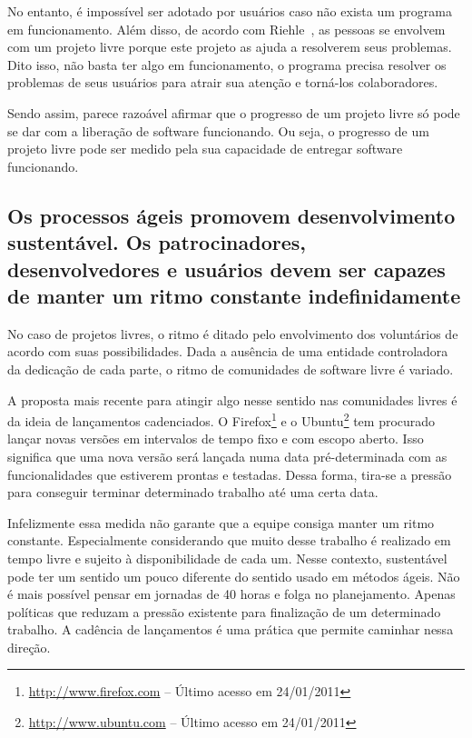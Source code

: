 No entanto, é impossível ser adotado por usuários caso não exista um
programa em funcionamento. Além disso, de acordo com
Riehle~\cite{Riehle2007}, as pessoas se envolvem com um projeto livre
porque este projeto as ajuda a resolverem seus problemas. Dito isso,
não basta ter algo em funcionamento, o programa precisa resolver os
problemas de seus usuários para atrair sua atenção e torná-los
colaboradores.

Sendo assim, parece razoável afirmar que o progresso de um projeto
livre só pode se dar com a liberação de software funcionando. Ou seja,
o progresso de um projeto livre pode ser medido pela sua capacidade de
entregar software funcionando.

\subsection[Ritmo sustentável]{Os processos ágeis promovem
  desenvolvimento sustentável. Os patrocinadores, desenvolvedores e
  usuários devem ser capazes de manter um ritmo constante
  indefinidamente}

No caso de projetos livres, o ritmo é ditado pelo envolvimento dos
voluntários de acordo com suas possibilidades. Dada a ausência de uma
entidade controladora da dedicação de cada parte, o ritmo de
comunidades de software livre é variado.

A proposta mais recente para atingir algo nesse sentido nas
comunidades livres é da ideia de lançamentos cadenciados. O
Firefox\footnote{\url{http://www.firefox.com} -- Último acesso em
  24/01/2011} e o Ubuntu\footnote{\url{http://www.ubuntu.com} --
  Último acesso em 24/01/2011} tem procurado lançar novas versões em
intervalos de tempo fixo e com escopo aberto. Isso significa que uma
nova versão será lançada numa data pré-determinada com as
funcionalidades que estiverem prontas e testadas.  Dessa forma,
tira-se a pressão para conseguir terminar determinado trabalho até uma
certa data.

Infelizmente essa medida não garante que a equipe consiga manter um
ritmo constante. Especialmente considerando que muito desse trabalho é
realizado em tempo livre e sujeito à disponibilidade de cada um. Nesse
contexto, sustentável pode ter um sentido um pouco diferente do
sentido usado em métodos ágeis. Não é mais possível pensar em jornadas
de 40 horas e folga no planejamento. Apenas políticas que reduzam a
pressão existente para finalização de um determinado trabalho. A
cadência de lançamentos é uma prática que permite caminhar nessa
direção.


